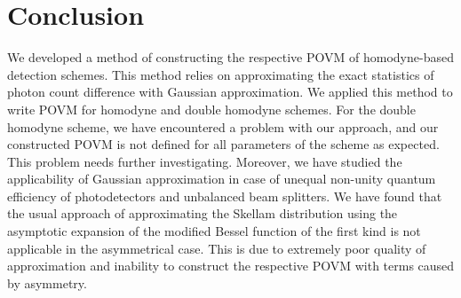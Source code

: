 \documentclass[]{article}
\begin{document}
\section{Conclusion}\label{sec-conclusion}
We developed a method of constructing the respective POVM of homodyne-based detection schemes. This method relies on approximating the exact statistics {of photon count difference} with Gaussian approximation. We applied this method to write POVM for homodyne and double homodyne schemes. For the double homodyne scheme, we have encountered a problem with our approach, {and our constructed POVM is not defined for all parameters of the scheme as expected}. This problem needs further investigating. Moreover, we have studied the applicability of Gaussian approximation in case of unequal non-unity quantum efficiency of photodetectors and unbalanced beam splitters. We have found that the usual approach of approximating the Skellam distribution using the asymptotic expansion of the modified Bessel function
of the first kind is not applicable in the asymmetrical case. {This is due to extremely poor quality of approximation and inability to construct the respective POVM with terms caused by asymmetry.}

\printbibliography
\clearpage
\appendix

\end{document}
